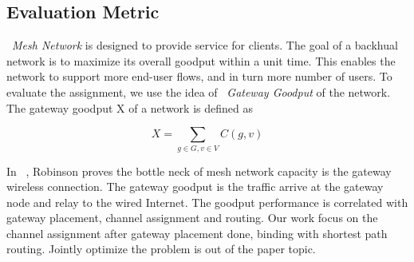 \subsection{Evaluation Metric}
\label{subsec:metric}
~\emph{Mesh Network} is designed to provide service for clients. The goal of a backhual network is to maximize its overall goodput within a unit time. 
This enables the network to support more end-user flows, and in turn more number of users. To evaluate the assignment, we use the idea of ~\emph{Gateway Goodput} of the network. The gateway goodput X of a network is defined as

\begin{equation}
\label{eq:goodput}
X=\sum_{g \in G, v \in V}C(g,v)
\end{equation}

In ~\cite{robinson2008adding}, Robinson proves the bottle neck of mesh network capacity is the gateway wireless connection. The gateway goodput is the traffic arrive at the gateway node and relay to the wired Internet. The goodput performance is correlated with gateway placement, channel assignment and routing. Our work focus on the channel assignment after gateway placement done, binding with shortest path routing. Jointly optimize the problem is out of the paper topic.

